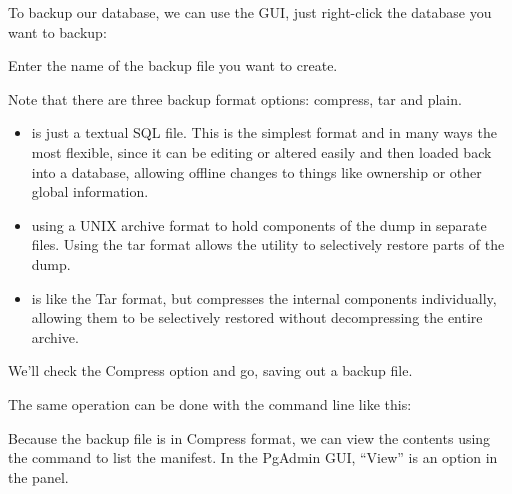 \documentclass[a4paper,11pt,english]{sphinxmanual}
\begin{document}
To backup our  database, we can use the GUI, just right-click the database you want to backup:

\noindent{}

Enter the name of the backup file you want to create.

\noindent{}

Note that there are three backup format options: compress, tar and plain.
\begin{itemize}
\item {} 
 is just a textual SQL file. This is the simplest format and in many ways the most flexible, since it can be editing or altered easily and then loaded back into a database, allowing offline changes to things like ownership or other global information.

\item {} 
 using a UNIX archive format to hold components of the dump in separate files. Using the tar format allows the  utility to selectively restore parts of the dump.

\item {} 
 is like the Tar format, but compresses the internal components individually, allowing them to be selectively restored without decompressing the entire archive.

\end{itemize}

We’ll check the Compress option and go, saving out a backup file.

The same operation can be done with the command line like this:

\begin{sphinxVerbatim}[commandchars=\\\{\}]
     
\end{sphinxVerbatim}

Because the backup file is in Compress format, we can view the contents using the  command to list the manifest. In the PgAdmin GUI, “View” is an option in the panel.
\end{document}
